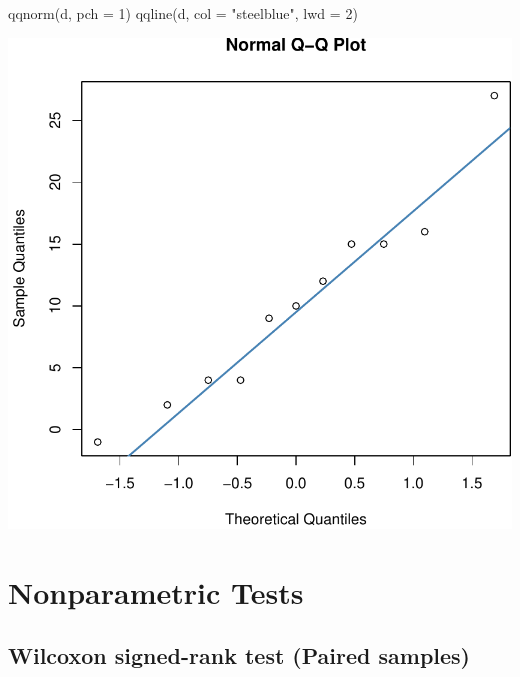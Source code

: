 \documentclass[
]{article}
\newcommand{\AttributeTok}[1]{\textcolor[rgb]{0.77,0.63,0.00}{#1}}
\newcommand{\DecValTok}[1]{\textcolor[rgb]{0.00,0.00,0.81}{#1}}
\newcommand{\FunctionTok}[1]{\textcolor[rgb]{0.00,0.00,0.00}{#1}}
\newcommand{\NormalTok}[1]{#1}
\newcommand{\StringTok}[1]{\textcolor[rgb]{0.31,0.60,0.02}{#1}}
\begin{document}
\begin{Highlighting}[]
\FunctionTok{qqnorm}\NormalTok{(d, }\AttributeTok{pch =} \DecValTok{1}\NormalTok{)}
\FunctionTok{qqline}\NormalTok{(d, }\AttributeTok{col =} \StringTok{"steelblue"}\NormalTok{, }\AttributeTok{lwd =} \DecValTok{2}\NormalTok{)}
\end{Highlighting}

\begin{center}\includegraphics[width=1\linewidth,height=1\textheight]{unnamed-chunk-59-2} \end{center}

\pagebreak

\hypertarget{nonparametric-tests}{%
\section{Nonparametric Tests}\label{nonparametric-tests}}

\hypertarget{wilcoxon-signed-rank-test-paired-samples}{%
\subsection{Wilcoxon signed-rank test (Paired
samples)}\label{wilcoxon-signed-rank-test-paired-samples}}
\end{document}
